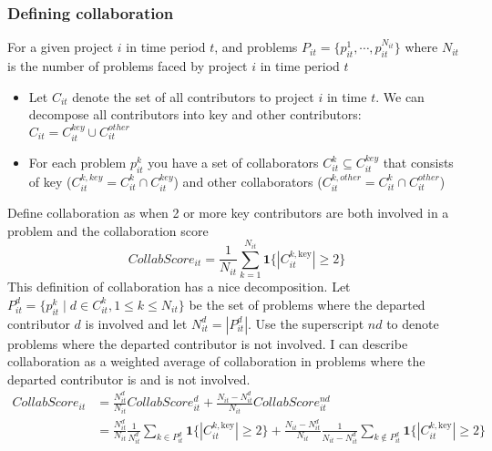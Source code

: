 \documentclass[12pt,notitlepage]{article}
\begin{document}
\subsubsection{Defining collaboration}
For a given project $i$ in time period $t$, and problems $P_{it} = \{p_{it}^1, \cdots, p_{it}^{N_{it}} \}$ where $N_{it}$ is the number of problems faced by project $i$ in time period $t$
\begin{itemize}
    \item Let $C_{it}$ denote the set of all contributors to project $i$ in time $t$. We can decompose all contributors into key and other contributors: $C_{it} = C_{it}^{key} \cup C_{it}^{other}$ 
    \item For each problem $p_{it}^k$ you have a set of collaborators $C_{it}^{k} \subseteq C_{it}^{key} $ that consists of key ($C_{it}^{k, key} = C_{it}^{k} \cap C_{it}^{key}$) and other collaborators ($C_{it}^{k, other} = C_{it}^{k} \cap C_{it}^{other}$)
\end{itemize}
Define collaboration as when 2 or more key contributors are both involved in a problem and the collaboration score
\begin{equation}
    CollabScore_{it} = \frac{1}{N_{it}}\sum_{k=1}^{N_{it}}\mathbf{1}\bigl\{|C_{it}^{k,\mathrm{key}}|\ge2\bigr\}
\end{equation}
This definition of collaboration has a nice decomposition. Let $P_{it}^d = \{p_{it}^{k} \mid d \in C_{it}^k, 1 \leq k \leq N_{it} \}$ be the set of problems where the departed contributor $d$ is involved and let $N_{it}^d = |P_{it}^d|$. Use the superscript $nd$ to denote problems where the departed contributor is not involved. I can describe collaboration as a weighted average of collaboration in problems where the departed contributor is and is not involved. 
\begin{align*}
    CollabScore_{it} &= \frac{N_{it}^d}{N_{it}} CollabScore_{it}^d + \frac{N_{it} - N_{it}^d}{N_{it}} CollabScore_{it}^{nd} \\
    &= \frac{N_{it}^d}{N_{it}} \frac{1}{N_{it}^d} \sum_{k \in P_{it}^d} \mathbf{1}\bigl\{|C_{it}^{k,\mathrm{key}}|\ge2\bigr\} + \frac{N_{it} - N_{it}^d}{N_{it}} \frac{1}{N_{it} - N_{it}^d} \sum_{k \notin P_{it}^d} \mathbf{1}\bigl\{|C_{it}^{k,\mathrm{key}}|\ge2\bigr\}
\end{align*}
\end{document}
